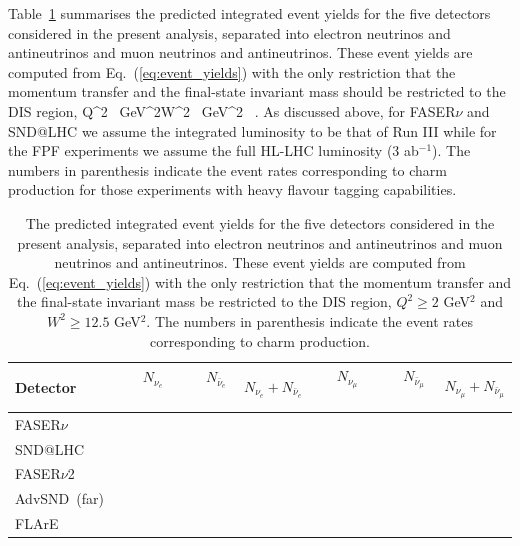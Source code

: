 Table~\ref{tab:integrated_rates} summarises the predicted integrated event yields for the five detectors considered
  in the present analysis, separated into electron neutrinos and antineutrinos
  and muon neutrinos and antineutrinos.
  These event yields are computed from Eq.~(\ref{eq:event_yields}) with the only
  restriction that the momentum transfer and the final-state invariant mass should be restricted
  to the DIS region,
  \be
  \label{eq:DISconditions}
Q^2 ~{\rm GeV}^2\quad  W^2 ~{\rm GeV}^2 \, .
\ee
  As discussed above, for FASER$\nu$ and SND@LHC we assume the integrated luminosity to
  be that of Run III while for the FPF experiments we assume the full HL-LHC
  luminosity (3 ab$^{-1}$).
   The numbers in parenthesis indicate the event rates corresponding to charm
  production for those experiments with heavy flavour tagging capabilities.

\begin{table}[t]
  \centering
  \small
  \renewcommand{\arraystretch}{1.60}
\begin{tabularx}{\textwidth}{X|c|c|c|c|c|c}
\toprule
Detector & $\quad$ $N_{\nu_e}$ $\quad$ &$\quad$ $N_{\bar{\nu}_e}$$\quad$   &   $N_{\nu_e} + N_{\bar{\nu}_e}$ &
$\quad$$N_{\nu_\mu}$ $\quad$ & $\quad$ $N_{\bar{\nu}_\mu}$ $\quad$  &   $N_{\nu_\mu} + N_{\bar{\nu}_\mu}$ \\
\midrule
FASER$\nu$  &    &    &   &   &    &    \\
SND@LHC  &    &    &   &   &    &    \\
\midrule
FASER$\nu$2  &    &    &   &   &    &    \\
AdvSND~(far)  &    &    &   &   &    &    \\
FLArE &    &    &   &   &    &    \\
  \bottomrule
\end{tabularx}
\vspace{0.2cm}
\caption{\small The predicted integrated event yields for the five detectors considered
  in the present analysis, separated into electron neutrinos and antineutrinos
  and muon neutrinos and antineutrinos.
  These event yields are computed from Eq.~(\ref{eq:event_yields}) with the only
  restriction that the momentum transfer and the final-state invariant mass be restricted
  to the DIS region, $Q^2 \ge 2$ GeV$^2$ and $W^2 \ge 12.5$ GeV$^2$.
  The numbers in parenthesis indicate the event rates corresponding to charm
  production.
  \label{tab:integrated_rates}
}
\end{table}

